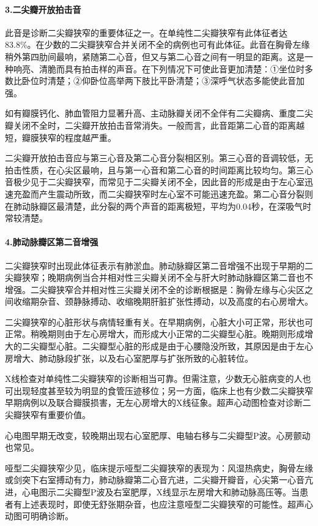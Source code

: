 \paragraph{3.二尖瓣开放拍击音}

此音是诊断二尖瓣狭窄的重要体征之一。在单纯性二尖瓣狭窄有此体征者达83.8\%。在少数的二尖瓣狭窄合并关闭不全的病例也可有此体征。此音在胸骨左缘稍外第四肋间最响，紧随第二心音，但又与第二心音之间有一明显的距离。这是一种响亮、清脆而具有拍击样的声音。在下列情况下可使此音更加清楚：①坐位时多数比卧位时清楚；②仰卧位高举两下肢比平卧清楚；③深呼气状态多能使此音加强。

如有瓣膜钙化、肺血管阻力显著升高、主动脉瓣关闭不全伴有二尖瓣病、重度二尖瓣关闭不全时，二尖瓣开放拍击音常消失。一般而言，此音距第二心音的距离越短，瓣膜狭窄的程度越严重。

二尖瓣开放拍击音应与第三心音及第二心音分裂相区别。第三心音的音调较低，无拍击性质，在心尖区最响，且与第一心音和第二心音的时间距离比较均匀。第三心音极少见于二尖瓣狭窄，而常见于二尖瓣关闭不全，因此音的形成是由于左心室迅速充盈而产生震动所致，而二尖瓣狭窄时左心室不可能迅速充盈。第二心音分裂则在肺动脉瓣区最清楚，此分裂的两个声音的距离极短，平均为0.04秒，在深吸气时常较清楚。

\paragraph{4.肺动脉瓣区第二音增强}

二尖瓣狭窄时出现此体征表示有肺淤血。肺动脉瓣区第二音增强不出现于早期的二尖瓣狭窄；晚期病例当合并相对性三尖瓣关闭不全与肝大时肺动脉瓣区第二音也不增强。二尖瓣狭窄合并相对性三尖瓣关闭不全的诊断根据是：胸骨左缘与心尖区之间收缩期杂音、颈静脉搏动、收缩晚期肝脏扩张性搏动，以及高度的右心房增大。

二尖瓣狭窄的心脏形状与病情轻重有关。在早期病例，心脏大小可正常，形状也可正常。稍晚期则由于左心房增大，而形成大小正常的二尖瓣型心脏。晚期则形成增大的二尖瓣型心脏。二尖瓣型心脏的形成是由于心腰隐没所致，其原因是由于左心房增大、肺动脉段扩张，以及右心室肥厚与扩张所致的心脏转位。

X线检查对单纯性二尖瓣狭窄的诊断相当可靠。但需注意，少数无心脏病变的人也可出现轻度甚至较为明显的食管压迹移位；另一方面，临床上也有少数二尖瓣狭窄早期病例以及联合瓣膜损害，无左心房增大的X线征象。超声心动图检查对诊断二尖瓣狭窄有重要价值。

心电图早期无改变，较晚期出现右心室肥厚、电轴右移与二尖瓣型P波。心房颤动也常见。

哑型二尖瓣狭窄少见，临床提示哑型二尖瓣狭窄的表现为：风湿热病史，胸骨左缘或剑突下右室搏动有力，肺动脉瓣第二心音亢进，二尖瓣开瓣音，心尖第一心音亢进，心电图示二尖瓣型P波及右室肥厚，X线显示左房增大和肺动脉高压等。当患者有上述表现时，即使无舒张期杂音，也应注意哑型二尖瓣狭窄的可能性。超声心动图可明确诊断。

